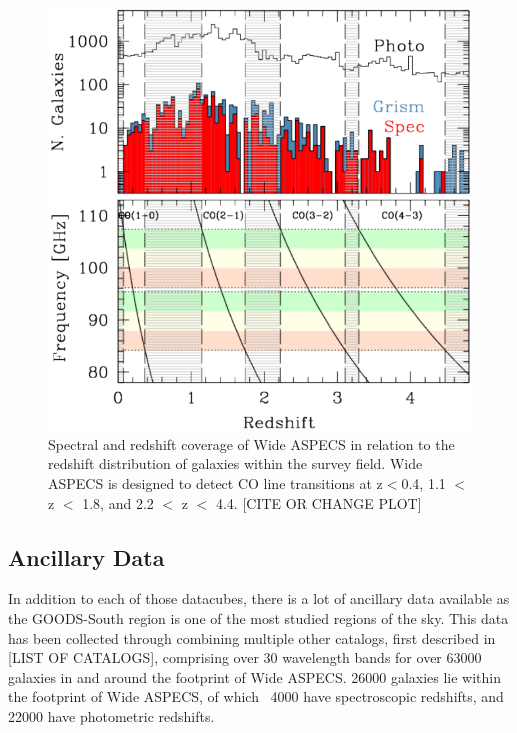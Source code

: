 \begin{figure}[tbp]
\centering
\includegraphics[width=120mm]{Wide_ASPECS_Freq.png}
\caption{Spectral and redshift coverage of Wide ASPECS in relation to the redshift distribution of galaxies within the survey field. Wide ASPECS is designed to detect CO line transitions at z$<$0.4, 1.1 $<$ z $<$ 1.8, and 2.2 $<$ z $<$ 4.4. [CITE OR CHANGE PLOT]}
\label{fig:ASPECS_Freq}
\end{figure}

\subsection{Ancillary Data}

In addition to each of those datacubes, there is a lot of ancillary data available as the GOODS-South region is one of the most studied regions of the sky. This data has been collected through combining multiple other catalogs, first described in [LIST OF CATALOGS], comprising over 30 wavelength bands for over 63000 galaxies in and around the footprint of Wide ASPECS. 26000 galaxies lie within the footprint of Wide ASPECS, of which ~4000 have spectroscopic redshifts, and 22000 have photometric redshifts. 

